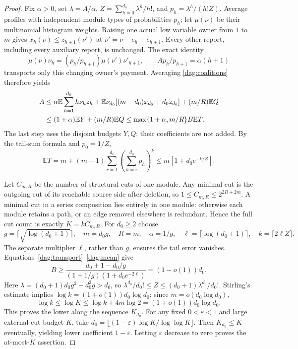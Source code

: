 \documentclass[11pt]{article}
\theoremstyle{definition}\newtheorem{definition}[theorem]{Definition}
\theoremstyle{remark}\newtheorem{remark}[theorem]{Remark}
\newcommand{\E}{\mathbb E}
\begin{document}
\begin{proof}
Fix $\alpha>0$, set $\lambda=A/\alpha$,
$Z=\sum_{h=0}^{d_0}\lambda^h/h!$, and $p_h=\lambda^h/(h!Z)$.
Average profiles with independent module types of probabilities $p_h$;
let $\mu(\nu)$ be their multinomial histogram weights. Raising one actual
low variable owner from $1$ to $m$ gives
$x_h(\nu)\le z_{h+1}(\nu')$ at
$\nu'=\nu-e_h+e_{h+1}$. Every other report, including every auxiliary report,
is unchanged. The exact identity
\[
 \mu(\nu)\nu_h=(p_h/p_{h+1})\mu(\nu')\nu'_{h+1},\qquad
 A p_h/p_{h+1}=\alpha(h+1)
\]
transports only this changing owner's payment. Averaging
\eqref{dag:coalitions} therefore yields
\begin{align}
 A&\le\alpha\E\sum_{h=1}^{d_0}h\nu_hz_h+
 \E\nu_{d_0}[(m-d_0)x_{d_0}+d_0z_{d_0}]+(m/R)\E Q\notag\\
 &\le(1+\alpha)\E Y+(m/R)\E Q
 \le\max\{1+\alpha,m/R\}B\E T.\label{dag:transport}
\end{align}
The last step uses the disjoint budgets $Y,Q$; their coefficients are not
added. By the tail-sum formula and $p_0=1/Z$,
\begin{equation}\label{dag:mean}
 \E T=m+(m-1)\sum_{r=1}^{d_0}\left(\sum_{h=r}^{d_0}p_h\right)^k
 \le m[1+d_0 e^{-k/Z}].
\end{equation}

Let $C_{m,R}$ be the number of structural cuts of one module. Any minimal
cut is the outgoing cut of its reachable source side after deletion, so
$1\le C_{m,R}\le2^{2R+2m}$. A minimal cut in a series composition lies
entirely in one module: otherwise each module retains a path, or an edge
removed elsewhere is redundant. Hence the full cut count is exactly
$K=kC_{m,R}$.
For $d_0\ge2$ choose
\[
 g=\lceil\sqrt{\log(d_0+1)}\rceil,\quad
 m=d_0g,\quad R=m,\quad \alpha=1/g,\quad
 \ell=\lceil\log(d_0+1)\rceil,\quad k=\lceil2\ell Z\rceil.
\]
The separate multiplier $\ell$, rather than $g$, ensures the tail error
vanishes. Equations~\eqref{dag:transport}--\eqref{dag:mean} give
\[
 B\ge\frac{d_0+1-d_0/g}{(1+1/g)(1+d_0e^{-2\ell})}=(1-o(1))d_0.
\]
Here $\lambda=(d_0+1)d_0g^2-d_0^2g>d_0$, so
$\lambda^{d_0}/d_0!\le Z\le(d_0+1)\lambda^{d_0}/d_0!$.
Stirling's estimate implies
$\log k=(1+o(1))d_0\log d_0$; since $m=o(d_0\log d_0)$,
\[
 \log k\le\log K\le\log k+4m\log2=(1+o(1))d_0\log d_0.
\]
This proves the lower along the sequence $K_{d_0}$. For any fixed
$0<\varepsilon<1$ and large external cut budget $K$, take
$d_0=\lfloor(1-\varepsilon)\log K/\log\log K\rfloor$.
Then $K_{d_0}\le K$ eventually, yielding lower coefficient $1-\varepsilon$.
Letting $\varepsilon$ decrease to zero proves the at-most-$K$ assertion.
\end{proof}
\end{document}
